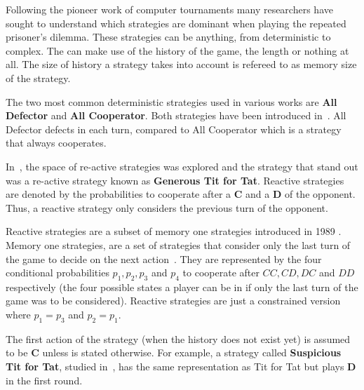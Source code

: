 \documentclass{article}
\begin{document}
Following the pioneer work of computer tournaments many researchers have sought to
understand which strategies are dominant when playing the repeated prisoner's
dilemma. These strategies can be anything, from deterministic to complex. The 
can make  use of the history of the game, the length or nothing at all. The size 
of history a strategy takes into account is refereed to as memory size of the
strategy. %

The two most common deterministic strategies used in various works are 
\textbf{All Defector} and \textbf{All Cooperator}. Both strategies have been 
introduced in~\cite{Axelrod1981}. All Defector defects in each turn, compared
to All Cooperator which is a strategy that always cooperates. 

In~\cite{Nowak1992}, the space of re-active strategies was explored and the 
strategy that stand out  was a re-active strategy known as \textbf{Generous Tit for Tat}. 
Reactive strategies are denoted by the probabilities to cooperate after a
\textbf{C} and a \textbf{D} of the opponent. Thus, a reactive strategy
only considers the previous turn of the opponent.

Reactive strategies are a subset of memory one strategies introduced in 1989
\cite{nowak1989}. Memory one strategies, are a set of strategies that 
consider only the last turn of the game to decide on the next action~\cite{Nowak1990}.
They are represented by the four conditional probabilities \(p_1, p_2, p_3\) and
\(p_4\) to cooperate after \(CC, CD, DC\) and \(DD\) respectively
(the four possible states a player can be in if only the last turn of the game was
to be considered). Reactive strategies are just a constrained version where 
\(p_1=p_3\) and \(p_2=p_1\). 



The first action of the strategy (when the history does not exist yet) is assumed
to be \textbf{C} unless is stated otherwise. For example, a strategy called
\textbf{Suspicious Tit for Tat}, studied in~\cite{Nowak1992}, has the same representation
as Tit for Tat but plays \textbf{D} in the first round.
\end{document}
